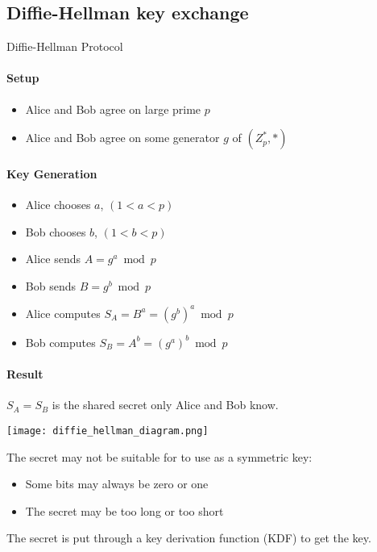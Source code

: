 \subsection{Diffie-Hellman key exchange}

\begin{KR}{Diffie-Hellman Protocol}
    \paragraph{Setup}
    \begin{itemize}
        \item Alice and Bob agree on large prime $p$
        \item Alice and Bob agree on some generator $g$ of $(Z_p^*, *)$
    \end{itemize}
    
    \paragraph{Key Generation}
    \begin{itemize}
        \item Alice chooses $a$, $(1 < a < p)$
        \item Bob chooses $b$, $(1 < b < p)$
        \item Alice sends $A = g^a \bmod p$
        \item Bob sends $B = g^b \bmod p$
        \item Alice computes $S_A = B^a = (g^b)^a \bmod p$
        \item Bob computes $S_B = A^b = (g^a)^b \bmod p$
    \end{itemize}
    
    \paragraph{Result}
    $S_A = S_B$ is the shared secret only Alice and Bob know.
\end{KR}

\texttt{[image: diffie\_hellman\_diagram.png]}

\begin{remark}
    The secret may not be suitable for to use as a symmetric key:
    \begin{itemize}
        \item Some bits may always be zero or one
        \item The secret may be too long or too short
    \end{itemize}
    
    The secret is put through a key derivation function (KDF) to get the key.
\end{remark}


